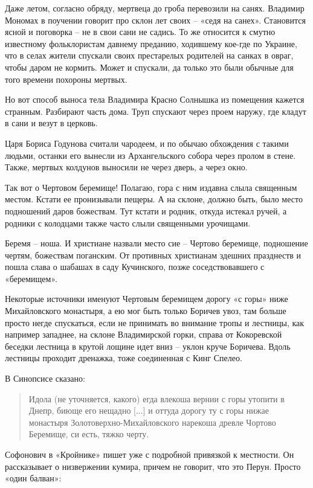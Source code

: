 Даже летом, согласно обряду, мертвеца до гроба перевозили на санях. Владимир Мономах в поучении говорит про склон лет своих – «седя на санех». Становится ясной и поговорка – не в свои сани не садись. То же относится к смутно известному фольклористам давнему преданию, ходившему кое-где по Украине, что в селах жители спускали своих престарелых родителей на санках в овраг, чтобы даром не кормить. Может и спускали, да только это были обычные для того времени похороны мертвых.

Но вот способ выноса тела Владимира Красно Солнышка из помещения кажется странным. Разбирают часть дома. Труп спускают через проем наружу, где кладут в сани и везут в церковь.

Царя Бориса Годунова считали чародеем, и по обычаю обхождения с такими людьми, останки его вынесли из Архангельского собора через пролом в стене. Также, мертвых колдунов выносили не через дверь, а через окно.

Так вот о Чертовом беремище! Полагаю, гора с ним издавна слыла священным местом. Кстати ее пронизывали пещеры. А на склоне, должно быть, было место подношений даров божествам. Тут кстати и родник, откуда истекал ручей, а родники с колодцами также часто слыли священными урочищами.

Беремя – ноша. И христиане назвали место сие – Чертово беремище, подношение чертям, божествам поганским. От противных христианам здешних празднеств и пошла слава о шабашах в саду Кучинского, позже соседствовавшего с «беремищем».

Некоторые источники именуют Чертовым беремищем дорогу «с горы» ниже Михайловского монастыря, а ею мог быть только Боричев увоз, там больше просто негде спускаться, если не принимать во внимание тропы и лестницы, как например западнее, на склоне Владимирской горки, справа от Кокоревской беседки лестница в крутой лощине идет вниз – уклон круче Боричева. Вдоль лестницы проходит дренажка, тоже соединенная с Кинг Спелео.

В Синопсисе\cite{sinopsis} сказано:

\begin{quotation}
Идола (не уточняется, какого) егда влекоша вернии с горы утопити в Днепр, биюще его нещадно [...] и оттуда дорогу ту с горы нижае монастыря Золотоверхно-Михайловского нарекоша древле Чортово Беремище, си есть, тяжко черту.
\end{quotation}

Софонович в «Кройнике» пишет уже с подробной привязкой к местности. Он рассказывает о низвержении кумира, причем не говорит, что это Перун. Просто «один балван»:

